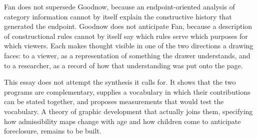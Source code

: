 \documentclass[11pt]{article}
\theoremstyle{remark}
\begin{document}
Fan does not supersede Goodnow, because an endpoint-oriented analysis of category information cannot by itself explain the constructive history that generated the endpoint. Goodnow does not anticipate Fan, because a description of constructional rules cannot by itself say which rules serve which purposes for which viewers. Each makes thought visible in one of the two directions a drawing faces: to a viewer, as a representation of something the drawer understands, and to a researcher, as a record of how that understanding was put onto the page.

This essay does not attempt the synthesis it calls for. It shows that the two programs are complementary, supplies a vocabulary in which their contributions can be stated together, and proposes measurements that would test the vocabulary. A theory of graphic development that actually joins them, specifying how admissibility maps change with age and how children come to anticipate foreclosure, remains to be built.
\end{document}
